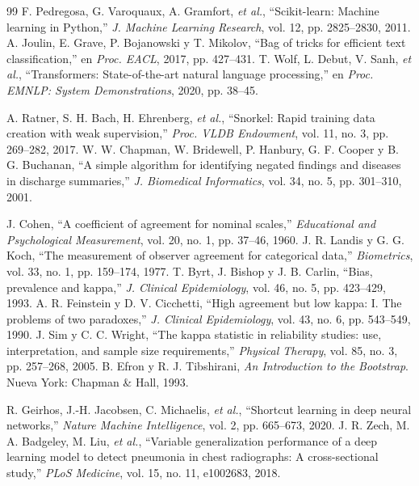 \documentclass[conference]{IEEEtran}
\begin{document}
\begin{thebibliography}{99}
 F. Pedregosa, G. Varoquaux, A. Gramfort, \emph{et al.},
``Scikit-learn: Machine learning in Python,'' \emph{J. Machine Learning
Research}, vol. 12, pp. 2825--2830, 2011.
 A. Joulin, E. Grave, P. Bojanowski y T. Mikolov, ``Bag of
tricks for efficient text classification,'' en \emph{Proc. EACL}, 2017,
pp. 427--431.
 T. Wolf, L. Debut, V. Sanh, \emph{et al.}, ``Transformers:
State-of-the-art natural language processing,'' en \emph{Proc. EMNLP: System
Demonstrations}, 2020, pp. 38--45.

 A. Ratner, S. H. Bach, H. Ehrenberg, \emph{et al.},
``Snorkel: Rapid training data creation with weak supervision,'' \emph{Proc.
VLDB Endowment}, vol. 11, no. 3, pp. 269--282, 2017.
 W. W. Chapman, W. Bridewell, P. Hanbury, G. F. Cooper y
B. G. Buchanan, ``A simple algorithm for identifying negated findings and
diseases in discharge summaries,'' \emph{J. Biomedical Informatics}, vol. 34,
no. 5, pp. 301--310, 2001.

 J. Cohen, ``A coefficient of agreement for nominal scales,''
\emph{Educational and Psychological Measurement}, vol. 20, no. 1, pp. 37--46,
1960.
 J. R. Landis y G. G. Koch, ``The measurement of observer
agreement for categorical data,'' \emph{Biometrics}, vol. 33, no. 1,
pp. 159--174, 1977.
 T. Byrt, J. Bishop y J. B. Carlin, ``Bias, prevalence and
kappa,'' \emph{J. Clinical Epidemiology}, vol. 46, no. 5, pp. 423--429, 1993.
 A. R. Feinstein y D. V. Cicchetti, ``High agreement but
low kappa: I. The problems of two paradoxes,'' \emph{J. Clinical
Epidemiology}, vol. 43, no. 6, pp. 543--549, 1990.
 J. Sim y C. C. Wright, ``The kappa statistic in reliability
studies: use, interpretation, and sample size requirements,'' \emph{Physical
Therapy}, vol. 85, no. 3, pp. 257--268, 2005.
 B. Efron y R. J. Tibshirani, \emph{An Introduction to the
Bootstrap}. Nueva York: Chapman \& Hall, 1993.

 R. Geirhos, J.-H. Jacobsen, C. Michaelis, \emph{et al.},
``Shortcut learning in deep neural networks,'' \emph{Nature Machine
Intelligence}, vol. 2, pp. 665--673, 2020.
 J. R. Zech, M. A. Badgeley, M. Liu, \emph{et al.}, ``Variable
generalization performance of a deep learning model to detect pneumonia in
chest radiographs: A cross-sectional study,'' \emph{PLoS Medicine}, vol. 15,
no. 11, e1002683, 2018.


\end{thebibliography}
\end{document}
